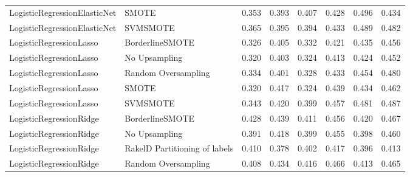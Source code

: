 \begin{tabular}{llllllll}
   LogisticRegressionElasticNet &                         SMOTE & 0.353 &                     0.393 &                 0.407 &                  0.428 &                                   0.496 &     0.434 \\
   LogisticRegressionElasticNet &                      SVMSMOTE & 0.365 &                     0.395 &                 0.394 &                  0.433 &                                   0.489 &     0.482 \\
        LogisticRegressionLasso &               BorderlineSMOTE & 0.326 &                     0.405 &                 0.332 &                  0.421 &                                   0.435 &     0.456 \\
        LogisticRegressionLasso &                 No Upsampling & 0.320 &                     0.403 &                 0.324 &                  0.413 &                                   0.424 &     0.452 \\
        LogisticRegressionLasso &           Random Oversampling & 0.334 &                     0.401 &                 0.328 &                  0.433 &                                   0.454 &     0.480 \\
        LogisticRegressionLasso &                         SMOTE & 0.320 &                     0.417 &                 0.324 &                  0.439 &                                   0.434 &     0.462 \\
        LogisticRegressionLasso &                      SVMSMOTE & 0.343 &                     0.420 &                 0.399 &                  0.457 &                                   0.481 &     0.487 \\
        LogisticRegressionRidge &               BorderlineSMOTE & 0.428 &                     0.439 &                 0.411 &                  0.456 &                                   0.420 &     0.467 \\
        LogisticRegressionRidge &                 No Upsampling & 0.391 &                     0.418 &                 0.399 &                  0.455 &                                   0.398 &     0.460 \\
        LogisticRegressionRidge & RakelD Partitioning of labels & 0.410 &                     0.378 &                 0.402 &                  0.417 &                                   0.396 &     0.413 \\
        LogisticRegressionRidge &           Random Oversampling & 0.408 &                     0.434 &                 0.416 &                  0.466 &                                   0.413 &     0.465 \\

\end{tabular}
